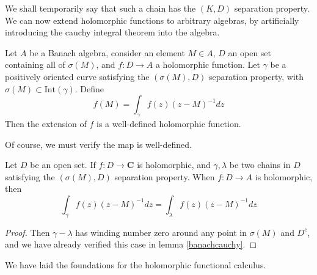 We shall temporarily say that such a chain has the $(K,D)$ separation property. We can now extend holomorphic functions to arbitrary algebras, by artificially introducing the cauchy integral theorem into the algebra.

\begin{definition}
    Let $A$ be a Banach algebra, consider an element $M \in A$, $D$ an open set containing all of $\sigma(M)$, and $f:D \to A$ a holomorphic function. Let $\gamma$ be a positively oriented curve satisfying the $(\sigma(M), D)$ separation property, with $\sigma(M) \subset \text{Int}(\gamma)$. Define
    \[ f(M) = \int_\gamma f(z) (z - M)^{-1} dz \]
    Then the extension of $f$ is a well-defined holomorphic function.
\end{definition}

Of course, we must verify the map is well-defined.

\begin{lemma}
    Let $D$ be an open set. If $f: D \to \mathbf{C}$ is holomorphic, and $\gamma, \lambda$ be two chains in $D$ satisfying the $(\sigma(M), D)$ separation property. When $f: D \to A$ is holomorphic, then
    \[ \int_\gamma f(z) (z - M)^{-1} dz = \int_\lambda f(z) (z - M)^{-1} dz \]
\end{lemma}
\begin{proof}
    Then $\gamma - \lambda$ has winding number zero around any point in $\sigma(M)$ and $D^c$, and we have already verified this case in lemma \ref{banachcauchy}.
\end{proof}

We have laid the foundations for the holomorphic functional calculus.

